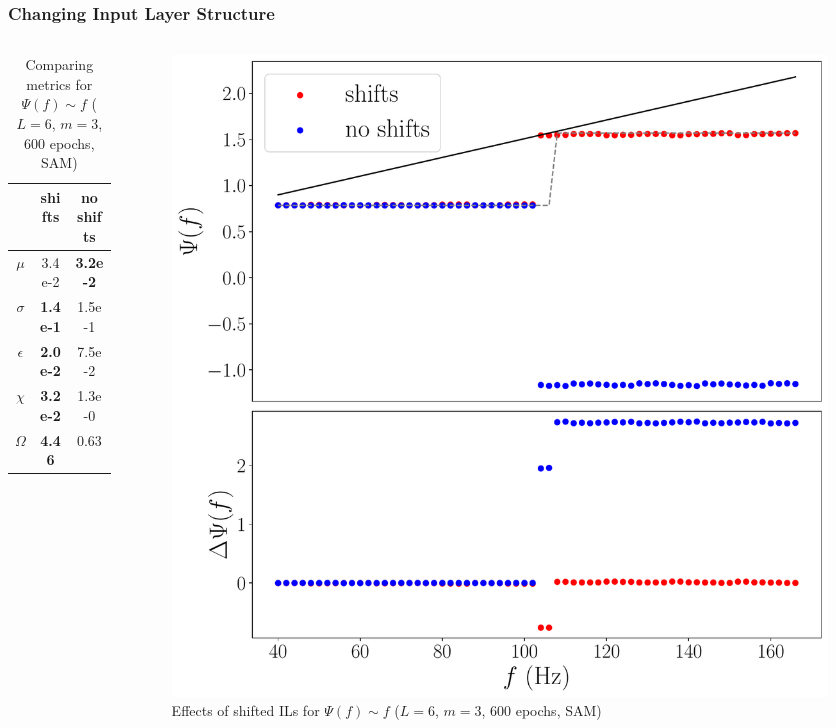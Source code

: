 \documentclass{beamer}
\begin{document}
\begin{frame}
\frametitle{Changing Input Layer Structure}
\begin{columns}
\begin{column}{0.5\textwidth}
\begin{table}
\begin{tabular}{c || c| c }
& shifts & no shifts \\ \hline \hline 
$\mu$ & 3.4e-2 & \alert{\textbf{3.2e-2}}  \\
$\sigma$ & \textbf{1.4e-1} & 1.5e-1  \\
$\epsilon$  & \textbf{2.0e-2} & 7.5e-2 \\
$\chi$ & \textbf{3.2e-2} & 1.3e-0    \\ \hline 
$\Omega$ &  \textbf{ 4.46} & 0.63
\end{tabular}
\caption{Comparing metrics for $\Psi(f) \sim f$ ($L=6$, $m=3$, 600 epochs, SAM)}
\end{table}
\end{column}
\begin{column}{0.5\textwidth}
\begin{figure}
\centering 
\includegraphics[width=\textwidth]{im/phase_shift_comp_linear_m3}
\caption{Effects of shifted ILs for $\Psi(f) \sim f$ ($L=6$, $m=3$, 600 epochs, SAM)}
\end{figure}
\end{column}
\end{columns}
\end{frame}
\end{document}
